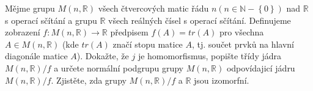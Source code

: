 Mějme grupu $M(n, \mathbb{R})$ všech čtvercových matic řádu $n(n \in \mathbb{N}
- \left \{ 0 \right \})$ nad $\mathbb{R}$ s operací sčítání a grupu $\mathbb{R}$
všech reálných čísel s operací sčítání. Definujeme zobrazení $f : M (n,
\mathbb{R}) \rightarrow \mathbb{R}$ předpisem $f(A)=tr(A)$ pro všechna $A \in
M(n, \mathbb{R})$ (kde $tr(A)$ značí stopu matice $A$, tj. součet prvků na
hlavní diagonále matice $A$).  Dokažte, že $j$ je homomorfismus, popište třídy
jádra $M(n, \mathbb{R})/f$ a určete normální podgrupu grupy $M(n, \mathbb{R})$
odpovídajicí jádru $M(n, \mathbb{R})/f$. Zjistěte, zda grupy $M(n,
\mathbb{R})/f$ a $\mathbb{R}$ jsou izomorfní.
